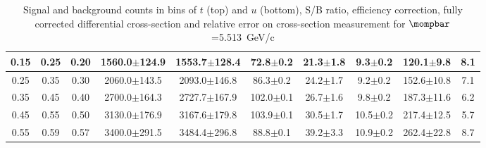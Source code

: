 \begin{landscape}
\begin{table}[hbpt]
\begin{center}
\begin{tabular}{|c|c|c|c|c|c|c|c|c|c|}
 \hline 
 0.15 & 0.25 & 0.20 & 1560.0$\pm$124.9 &  1553.7$\pm$128.4 &  72.8$\pm$0.2 &  21.3$\pm$1.8 & 9.3$\pm$0.2 &  120.1$\pm$9.8 & 8.1 \\ 
 \hline 
 0.25 & 0.35 & 0.30 & 2060.0$\pm$143.5 &  2093.0$\pm$146.8 &  86.3$\pm$0.2 &  24.2$\pm$1.7 & 9.2$\pm$0.2 &  152.6$\pm$10.8 & 7.1 \\ 
 \hline 
 0.35 & 0.45 & 0.40 & 2700.0$\pm$164.3 &  2727.7$\pm$167.9 &  102.0$\pm$0.1 &  26.7$\pm$1.6 & 9.8$\pm$0.2 &  187.3$\pm$11.6 & 6.2 \\ 
 \hline 
 0.45 & 0.55 & 0.50 & 3130.0$\pm$176.9 &  3167.6$\pm$179.8 &  103.9$\pm$0.1 &  30.5$\pm$1.7 & 10.5$\pm$0.2 &  217.4$\pm$12.5 & 5.7 \\ 
 \hline 
 0.55 & 0.59 & 0.57 & 3400.0$\pm$291.5 &  3484.4$\pm$296.8 &  88.8$\pm$0.1 &  39.2$\pm$3.3 & 10.9$\pm$0.2 &  262.4$\pm$22.8 & 8.7 \\ 
 \hline 
    \end{tabular}
\caption{Signal and background counts in bins of $t$ (top) and $u$
         (bottom), S/B ratio, efficiency correction, fully corrected
         differential cross-section and relative error on cross-section
         measurement for $\mompbar$=5.513~GeV/c}
  \end{center}
\end{table}
\end{landscape}
